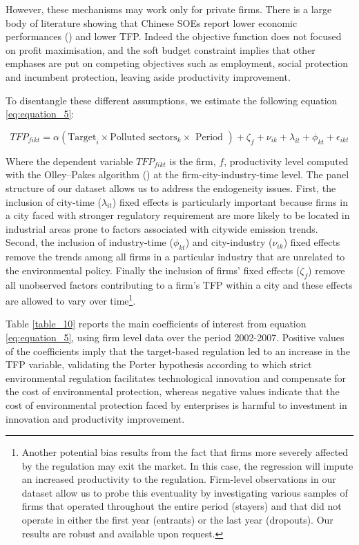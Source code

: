 \documentclass[12pt]{article}
\begin{document}
However, these mechanisms may work only for private firms. There is a large body of literature showing that Chinese SOEs report lower economic performances (\cite{Zhang2004-ij,Dougherty2007-qu,Qian1996-ab}) and lower TFP. Indeed the objective function does not focused on profit maximisation, and the soft budget constraint implies that other emphases are put on competing objectives such as employment, social protection and incumbent protection, leaving aside productivity improvement. 

To disentangle these different assumptions, we estimate the following equation \ref{eq:equation_5}:

\begin{equation} \label{eq:equation_5}
TFP_{fikt}=\alpha\left(\text {Target}_{i} \times \text {Polluted sectors}_{k} \times \text { Period }\right)+ \zeta_{f}+ \nu_{i k}+\lambda_{i t}+\phi_{k t}+\epsilon_{i k t}
\end{equation}

Where the dependent variable $TFP_{fikt }$ is the firm, $f$, productivity level computed with the Olley–Pakes algorithm (\cite{Olley1996-yl}) at the firm-city-industry-time level. The panel structure of our dataset allows us to address the endogeneity issues. First, the inclusion of city-time ($\lambda_{i t}$) fixed effects is particularly important because firms in a city faced with stronger regulatory requirement are more likely to be located in industrial areas prone to factors associated with citywide emission trends. Second, the inclusion of industry-time ($\phi_{k t}$) and city-industry ($\nu_{i k}$) fixed effects remove the trends among all firms in a particular industry that are unrelated to the environmental policy. Finally the inclusion of firms' fixed effects ($\zeta_{f}$) remove all unobserved factors contributing to a firm's TFP within a city and these effects are allowed to vary over time\footnote{Another potential bias results from the fact that firms more severely affected by the regulation may exit the market. In this case, the regression will impute an increased productivity to the regulation. Firm-level observations in our dataset allow us to probe this eventuality by investigating various samples of firms that operated throughout the entire period (stayers) and that did not operate in either the first year (entrants) or the last year (dropouts). Our results are robust and available upon request.}. 


Table \ref{table_10} reports the main coefficients of interest from equation \ref{eq:equation_5}, using firm level data over the period 2002-2007. Positive values of the coefficients imply that the target-based regulation led to an increase in the TFP variable, validating the Porter hypothesis according to which strict environmental regulation facilitates technological innovation and compensate for the cost of environmental protection, whereas negative values indicate that the cost of environmental protection faced by enterprises is harmful to investment in innovation and productivity improvement. 
\end{document}
